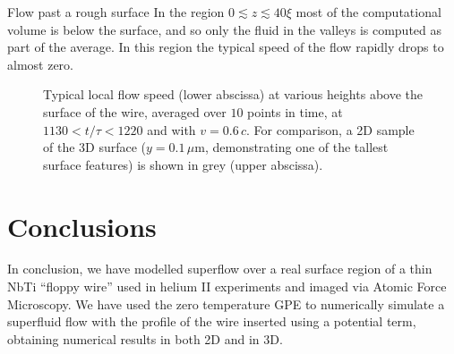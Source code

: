 \begin{chapter}{\label{cha:afm}Flow past a rough surface}
In the region $0 \lesssim z \lesssim 40\xi$ most of the computational volume is below the surface, and so only the fluid in the valleys is computed as part of the average. In this region the typical speed of the flow rapidly drops to almost zero.

\begin{figure}
  \centering
  \caption{Typical local flow speed (lower abscissa) at various heights above the surface of the wire, averaged over $10$ points in time, at $1130<t/\tau<1220$ and with $v=0.6\,c$. For comparison, a 2D sample of the 3D surface ($y=0.1\,\mu$m, demonstrating one of the tallest surface features) is shown in grey (upper abscissa).} 
  \end{figure}

\section{Conclusions}
In conclusion, we have modelled superflow over a real surface region of a thin NbTi ``floppy wire'' used in helium II experiments and imaged via Atomic Force Microscopy. We have used the zero temperature GPE to numerically simulate a superfluid flow with the profile of the wire inserted using a potential term, obtaining numerical results in both 2D and in 3D.


\end{chapter}

